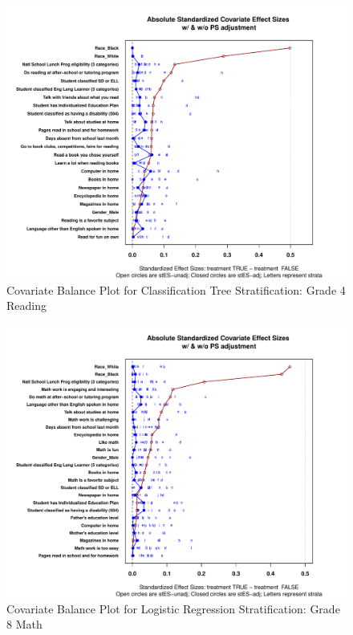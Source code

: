 \begin{figure}
\begin{center}
\includegraphics[width=\textwidth]{../Figures2009/g4read-tree-balance.pdf}
\caption{Covariate Balance Plot for Classification Tree Stratification: Grade 4 Reading}
\end{center}
\end{figure}

\begin{figure}[h!]
\begin{center}
\includegraphics[width=\textwidth]{../Figures2009/g8math-lr-balance.pdf}
\caption{Covariate Balance Plot for Logistic Regression Stratification: Grade 8 Math}
\end{center}
\end{figure}

